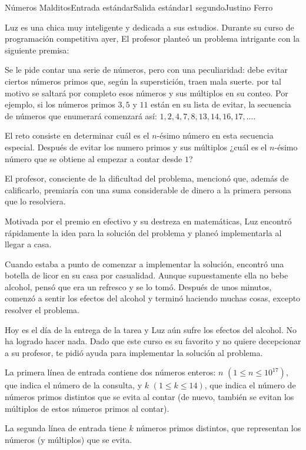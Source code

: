 \begin{problem}{Números Malditos}{Entrada estándar}{Salida estándar}{1 segundo}{}{Justino Ferro}

Luz es una chica muy inteligente y dedicada a sus estudios. Durante su curso de programación competitiva ayer, El profesor planteó un problema intrigante con la siguiente premisa:

Se le pide contar una serie de números, pero con una peculiaridad: debe evitar ciertos números primos que, según la superstición, traen mala suerte. por tal motivo se saltará por completo esos números y sus múltiplos en su conteo. Por ejemplo, si los números primos $3, 5$ y $11$ están en su lista de evitar, la secuencia de números que enumerará comenzará así: $1, 2, 4, 7, 8, 13, 14, 16, 17,. . .$.

El reto consiste en determinar cuál es el $n$-ésimo número en esta secuencia especial. Después de evitar los numero primos y sus múltiplos ¿cuál es el $n$-ésimo número que se obtiene al empezar a contar desde $1$?


El profesor, consciente de la dificultad del problema, mencionó que, además de calificarlo, premiaría con una suma considerable de dinero a la primera persona que lo resolviera.


Motivada por el premio en efectivo y su destreza en matemáticas, Luz encontró rápidamente la idea para la solución del problema y planeó implementarla al llegar a casa.


Cuando estaba a punto de comenzar a implementar la solución, encontró una botella de licor en su casa por casualidad. Aunque supuestamente ella no  bebe alcohol, pensó que era un refresco y se lo tomó. Después de unos minutos, comenzó a sentir los efectos del alcohol y terminó haciendo muchas cosas, excepto resolver el problema.


Hoy es el día de la entrega de la tarea y Luz aún sufre los efectos del alcohol. No ha logrado hacer nada. Dado que este curso es su favorito y no quiere decepcionar a su profesor, te pidió ayuda para implementar la solución al problema.

  
\InputFile

La primera línea de entrada contiene dos números enteros: $n$  $(1 \leq n \leq 10^{17})$, que indica el número de la consulta, y $k$  $(1 \leq k \leq 14)$, que indica el número de números primos distintos que  se evita al contar (de nuevo, también se evitan los múltiplos de estos números primos al contar).

La segunda línea de entrada tiene $k$ números primos distintos, que representan los números (y múltiplos) que se evita.


\end{problem}
